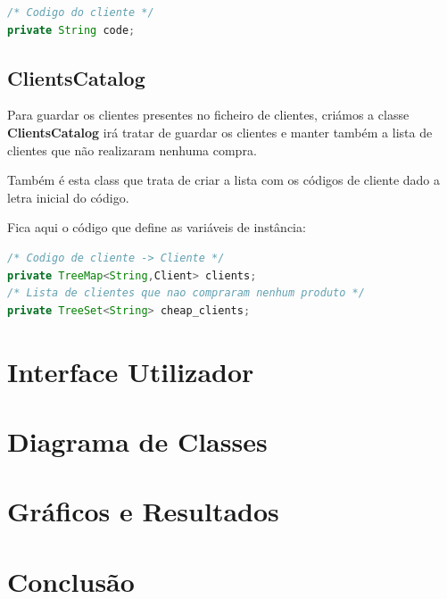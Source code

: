 \documentclass[10pt] {article}
\begin{document}
\begin{lstlisting}[language=Java]
/* Codigo do cliente */
private String code;
\end{lstlisting}

\subsection{ClientsCatalog}
\par Para guardar os clientes presentes no ficheiro de clientes, criámos a classe \textbf{ClientsCatalog} irá tratar de guardar 
os clientes e manter também a lista de clientes que não realizaram nenhuma compra.
\par Também é esta class que trata de criar a lista com os códigos de cliente dado a letra inicial do código.
\par Fica aqui o código que define as variáveis de instância:
\begin{lstlisting}[language=Java]
/* Codigo de cliente -> Cliente */
private TreeMap<String,Client> clients;
/* Lista de clientes que nao compraram nenhum produto */
private TreeSet<String> cheap_clients;
\end{lstlisting}

\newpage
\section{Interface Utilizador}

\newpage
\section{Diagrama de Classes}

\newpage
\section{Gráficos e Resultados}

\newpage
\section{Conclusão}
\end{document}
